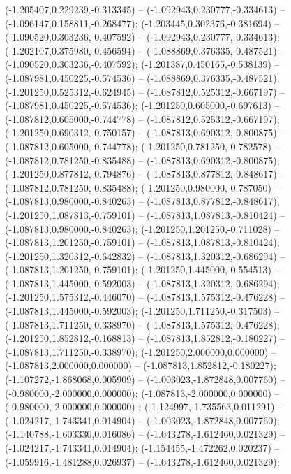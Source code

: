  (-1.205407,0.229239,-0.313345) -- (-1.092943,0.230777,-0.334613) -- (-1.096147,0.158811,-0.268477);
 (-1.203445,0.302376,-0.381694) -- (-1.090520,0.303236,-0.407592) -- (-1.092943,0.230777,-0.334613);
 (-1.202107,0.375980,-0.456594) -- (-1.088869,0.376335,-0.487521) -- (-1.090520,0.303236,-0.407592);
 (-1.201387,0.450165,-0.538139) -- (-1.087981,0.450225,-0.574536) -- (-1.088869,0.376335,-0.487521);
 (-1.201250,0.525312,-0.624945) -- (-1.087812,0.525312,-0.667197) -- (-1.087981,0.450225,-0.574536);
 (-1.201250,0.605000,-0.697613) -- (-1.087812,0.605000,-0.744778) -- (-1.087812,0.525312,-0.667197);
 (-1.201250,0.690312,-0.750157) -- (-1.087813,0.690312,-0.800875) -- (-1.087812,0.605000,-0.744778);
 (-1.201250,0.781250,-0.782578) -- (-1.087812,0.781250,-0.835488) -- (-1.087813,0.690312,-0.800875);
 (-1.201250,0.877812,-0.794876) -- (-1.087813,0.877812,-0.848617) -- (-1.087812,0.781250,-0.835488);
 (-1.201250,0.980000,-0.787050) -- (-1.087813,0.980000,-0.840263) -- (-1.087813,0.877812,-0.848617);
 (-1.201250,1.087813,-0.759101) -- (-1.087813,1.087813,-0.810424) -- (-1.087813,0.980000,-0.840263);
 (-1.201250,1.201250,-0.711028) -- (-1.087813,1.201250,-0.759101) -- (-1.087813,1.087813,-0.810424);
 (-1.201250,1.320312,-0.642832) -- (-1.087813,1.320312,-0.686294) -- (-1.087813,1.201250,-0.759101);
 (-1.201250,1.445000,-0.554513) -- (-1.087813,1.445000,-0.592003) -- (-1.087813,1.320312,-0.686294);
 (-1.201250,1.575312,-0.446070) -- (-1.087813,1.575312,-0.476228) -- (-1.087813,1.445000,-0.592003);
 (-1.201250,1.711250,-0.317503) -- (-1.087813,1.711250,-0.338970) -- (-1.087813,1.575312,-0.476228);
 (-1.201250,1.852812,-0.168813) -- (-1.087813,1.852812,-0.180227) -- (-1.087813,1.711250,-0.338970);
 (-1.201250,2.000000,0.000000) -- (-1.087813,2.000000,0.000000) -- (-1.087813,1.852812,-0.180227);
 (-1.107272,-1.868068,0.005909) -- (-1.003023,-1.872848,0.007760) -- (-0.980000,-2.000000,0.000000);
 (-1.087813,-2.000000,0.000000) -- (-0.980000,-2.000000,0.000000) ;
 (-1.124997,-1.735563,0.011291) -- (-1.024217,-1.743341,0.014904) -- (-1.003023,-1.872848,0.007760);
 (-1.140788,-1.603330,0.016086) -- (-1.043278,-1.612460,0.021329) -- (-1.024217,-1.743341,0.014904);
 (-1.154455,-1.472262,0.020237) -- (-1.059916,-1.481288,0.026937) -- (-1.043278,-1.612460,0.021329);
